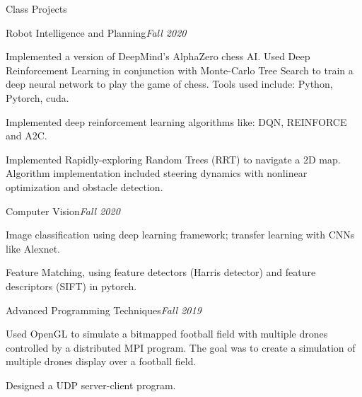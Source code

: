 \documentclass{resume} %
\begin{document}
\begin{rSection}{Class Projects}
\begin{rSubsection}{Robot Intelligence and Planning}{\em Fall 2020}{}{}
\item Implemented a version of DeepMind's AlphaZero chess AI. Used Deep Reinforcement Learning in conjunction with Monte-Carlo Tree Search to train a deep neural network to play the game of chess. Tools used include: Python, Pytorch, cuda.

\item Implemented deep reinforcement learning algorithms like: DQN, REINFORCE and A2C.

\item Implemented Rapidly-exploring Random Trees (RRT) to navigate a 2D map. Algorithm implementation included steering dynamics with nonlinear optimization and obstacle detection.

\end{rSubsection}
\begin{rSubsection}{Computer Vision}{\em Fall 2020}{}{}
\item Image classification using deep learning framework; transfer learning with CNNs like Alexnet.
\item Feature Matching, using feature detectors (Harris detector) and feature descriptors (SIFT) in pytorch.
\end{rSubsection}
\begin{rSubsection}{Advanced Programming Techniques}{\em Fall 2019}{}{}
\item Used OpenGL to simulate a bitmapped football field with multiple drones controlled by a distributed MPI program. The goal was to create a simulation of multiple drones display over a football field. 
\item Designed a UDP server-client program.
\end{rSubsection}

\end{rSection}

\end{document}
